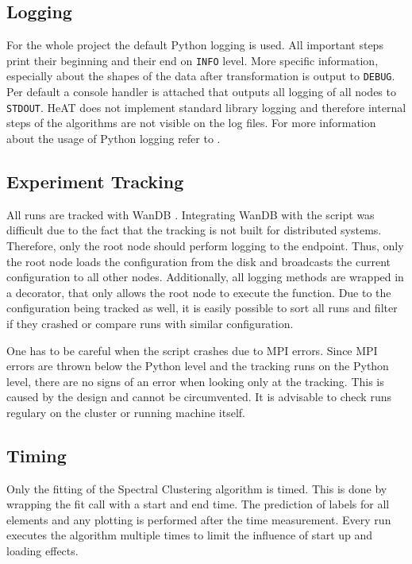 \subsection{Logging}
\label{subsec:logging}
For the whole project the default Python logging \cite{noauthor_pep_nodate} is used.
All important steps print their beginning and their end on \lstinline{INFO} level.
More specific information, especially about the shapes of the data after transformation is output to \lstinline{DEBUG}.
Per default a console handler is attached that outputs all logging of all nodes to \lstinline{STDOUT}.
\gls{HeAT} does not implement standard library logging and therefore internal steps of the algorithms are not visible on the log files.
For more information about the usage of Python logging refer to \cite{noauthor_pep_nodate}.


\subsection{Experiment Tracking}
\label{subsec:experiment_tracking}
All runs are tracked with WanDB \cite{noauthor_weights_nodate}. Integrating WanDB with the script was difficult due
to the fact that the tracking is not built for distributed systems. Therefore, only the root node should perform
logging to the endpoint.
Thus, only the root node loads the configuration from the disk and broadcasts the current configuration
to all other nodes.
Additionally, all logging methods are wrapped in a decorator, that only allows the root node to execute the function.
Due to the configuration being tracked as well, it is easily possible to sort all runs and filter if they crashed or
compare runs with similar configuration.

One has to be careful when the script crashes due to \gls{MPI} errors. Since \gls{MPI} errors are thrown
below the Python level and the tracking runs on the Python level, there are no signs of an error when looking only at
the tracking. This is caused by the design and cannot be circumvented. It is advisable to check runs regulary on
the cluster or running machine itself.

\subsection{Timing}
\label{subsec:timing}
Only the fitting of the Spectral Clustering algorithm is timed. This is done by wrapping the fit call with a start
and end time. The prediction of labels for all elements and any plotting is performed after the time measurement.
Every run executes the algorithm multiple times to limit the influence of start up and loading effects.

